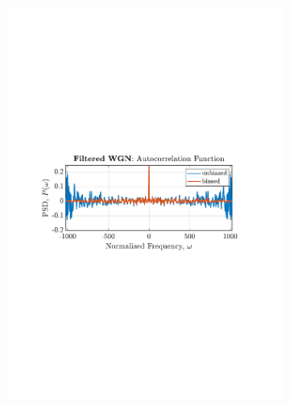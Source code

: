 \documentclass[12pt]{article}
\begin{document}
\begin{figure}[H]
\begin{subfigure}{0.49\textwidth}
			\includegraphics[trim={2.2cm 11.2cm 3.15cm  11.2cm}, clip, width=\textwidth]{../MATLAB/figures/q1_3a_fig05.pdf} 
		\end{subfigure}
		\begin{subfigure}{0.49\textwidth}
			\centering

\end{subfigure}
\end{figure}
\end{document}

